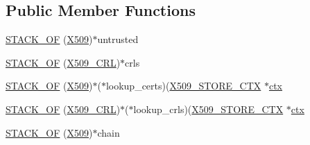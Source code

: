 \subsection*{Public Member Functions}
\begin{DoxyCompactItemize}
\item 
\hyperlink{structx509__store__ctx__st_a546a89dab72d8fa5a48a6d250bf2f320}{S\+T\+A\+C\+K\+\_\+\+OF} (\hyperlink{ossl__typ_8h_a4f666bde6518f95deb3050c54b408416}{X509})$\ast$untrusted
\item 
\hyperlink{structx509__store__ctx__st_a97b2a77c7beeea1cf73a0ad5243f2d98}{S\+T\+A\+C\+K\+\_\+\+OF} (\hyperlink{ossl__typ_8h_ac8661d2485c2c8da5fd7dd26b846f4bf}{X509\+\_\+\+C\+RL})$\ast$crls
\item 
\hyperlink{structx509__store__ctx__st_a5b90bf307077e1d7f416088bfaa39173}{S\+T\+A\+C\+K\+\_\+\+OF} (\hyperlink{ossl__typ_8h_a4f666bde6518f95deb3050c54b408416}{X509})$\ast$($\ast$lookup\+\_\+certs)(\hyperlink{ossl__typ_8h_ae681945a2cf88d6337137dc0260a1545}{X509\+\_\+\+S\+T\+O\+R\+E\+\_\+\+C\+TX} $\ast$\hyperlink{structx509__store__ctx__st_ac633a0b046f10408d0becf0f1732ede5}{ctx}
\item 
\hyperlink{structx509__store__ctx__st_a74148f9c29f0ba50528f877662006709}{S\+T\+A\+C\+K\+\_\+\+OF} (\hyperlink{ossl__typ_8h_ac8661d2485c2c8da5fd7dd26b846f4bf}{X509\+\_\+\+C\+RL})$\ast$($\ast$lookup\+\_\+crls)(\hyperlink{ossl__typ_8h_ae681945a2cf88d6337137dc0260a1545}{X509\+\_\+\+S\+T\+O\+R\+E\+\_\+\+C\+TX} $\ast$\hyperlink{structx509__store__ctx__st_ac633a0b046f10408d0becf0f1732ede5}{ctx}
\item 
\hyperlink{structx509__store__ctx__st_a9eecfd0e612ad76c36ffaab1fff26ae8}{S\+T\+A\+C\+K\+\_\+\+OF} (\hyperlink{ossl__typ_8h_a4f666bde6518f95deb3050c54b408416}{X509})$\ast$chain
\end{DoxyCompactItemize}
